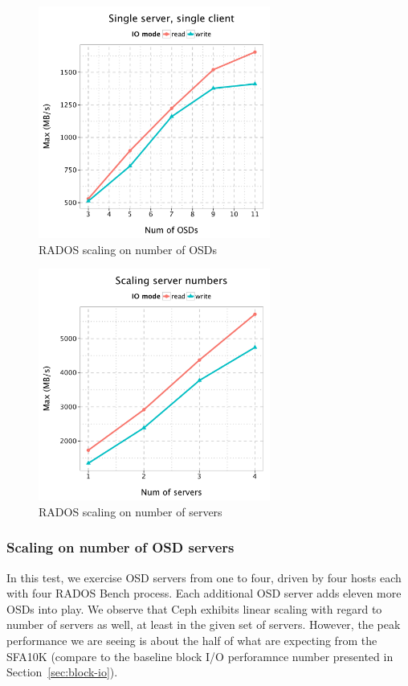 \begin{figure}[!t]
\centering
\includegraphics[width=3in]{data/rados_osd}
\caption{RADOS scaling on number of OSDs}
\label{fig:osd-scale}
\end{figure}

\begin{figure}[!t]
\centering
\includegraphics[width=3in]{data/rados_server}
\caption{RADOS scaling on number of servers}
\label{fig:oss-scale}
\end{figure}

\subsubsection{Scaling on number of OSD servers}

In this test, we exercise OSD servers from one to four, driven by four hosts
each with four RADOS Bench process. Each additional OSD server
adds eleven more OSDs into play. We observe that Ceph exhibits linear scaling with
regard to number of servers as well, at least in the given set of servers.
However, the peak performance we are seeing is about the half of what are
expecting from the SFA10K (compare to the baseline block I/O perforamnce number
presented in Section~\ref{sec:block-io}).

